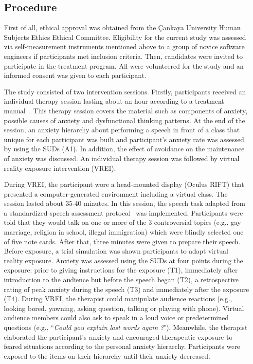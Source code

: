 \documentclass{llncs}
\begin{document}
\subsection{Procedure}

First of all, ethical approval was obtained from the \c{C}ankaya University Human Subjects Ethics Ethical Committee. Eligibility for the current study was assessed via self-measurement instruments mentioned above to a group of novice software engineers if participants met inclusion criteria. Then, candidates were invited to participate in the treatment program. All were volunteered for the study and an informed consent was given to each participant.  

The study consisted of two intervention sessions. Firstly, participants received an individual therapy session lasting about an hour according to a treatment manual~\cite{hope2010managing}. This therapy session covers the material such as components of anxiety, possible causes of anxiety and dysfunctional thinking patterns. At the end of the session, an anxiety hierarchy about performing a speech in front of a class that unique for each participant was built and participant's anxiety rate was assessed by using the SUDs (A1). In addition, the effect of avoidance on the maintenance of anxiety was discussed. An individual therapy session was followed by virtual reality exposure intervention (VREI).  

During VREI, the participant wore a head-mounted display (Oculus RIFT) that presented a computer-generated environment including a virtual class. The session lasted about 35-40 minutes. In this session, the speech task adapted from a standardized speech assessment protocol~\cite{beidel1989assessment} was implemented. Participants were told that they would talk on one or more of the 3 controversial topics (e.g., gay marriage, religion in school, illegal immigration) which were blindly selected one of five note cards. After that, three minutes were given to prepare their speech. Before exposure, a trial simulation was shown participants to adapt virtual reality exposure. Anxiety was assessed using the SUDs at four points during the exposure: prior to giving instructions for the exposure (T1), immediately after introduction to the audience but before the speech began (T2), a retrospective rating of peak anxiety during the speech (T3) and immediately after the exposure (T4). During VREI, the therapist could manipulate audience reactions (e.g., looking bored, yawning, asking question, talking or playing with phone). Virtual audience members could also ask to speak in a loud voice or predetermined questions (e.g., ``\emph{Could you explain last words again ?}"). Meanwhile, the therapist elaborated the participant's anxiety and encouraged therapeutic exposure to feared situations according to the personal anxiety hierarchy. Participants were exposed to the items on their hierarchy until their anxiety decreased.
\end{document}
